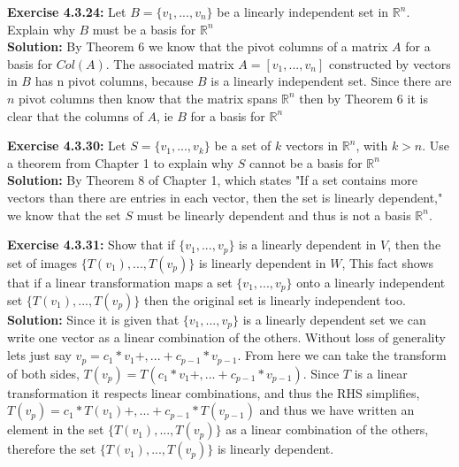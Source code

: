 \documentclass{amsart}
\def\RR{{\mathbb R}}
\begin{document}
\begin{enumerate}
\noindent\textbf{Exercise 4.3.24: } Let $B = \{v_1,...,v_n\}$ be a linearly independent set in $\RR^n$. Explain why $B$ must be a basis for $\RR^n$\\
\noindent \textbf{Solution: } By Theorem 6 we know that the pivot columns of a matrix $A$ for a basis for $Col(A)$. The associated matrix $A = [v_1,...,v_n]$ constructed by vectors in $B$ has n pivot columns, because $B$ is a linearly independent set. Since there are $n$ pivot columns then know that the matrix spans $\RR^n$ then by Theorem 6 it is clear that the columns of $A$, ie $B$ for a basis for $\RR^n$
\vspace{1in}


\noindent\textbf{Exercise 4.3.30: } Let $S =  \{v_1,...,v_k\}$ be a set of $k$ vectors in $\RR^n$, with $k>n$. Use a theorem from Chapter 1 to explain why $S$ cannot be a basis for $\RR^n$ \\

\noindent \textbf{Solution: } By Theorem 8 of Chapter 1, which states "If a set contains more vectors than there are entries in each vector, then the set is linearly dependent," we know that the set $S$ must be linearly dependent and thus is not a basis $\RR^n$.
\vspace{1in}


\noindent\textbf{Exercise 4.3.31: } Show that if $\{v_1,...,v_p\}$ is a linearly dependent in $V$, then the set of images $\{T(v_1),...,T(v_p)\}$ is linearly dependent in $W$, This fact shows that if a linear transformation maps a set $\{v_1,...,v_p\}$ onto a linearly independent set $\{T(v_1),...,T(v_p)\}$ then the original set is linearly independent too.  \\
\noindent \textbf{Solution: } Since it is given that  $\{v_1,...,v_p\}$ is a linearly dependent set we can write one vector as a linear combination of the others. Without loss of generality lets just say $v_p = c_1*v_1+,...+c_{p-1}*v_{p-1}$. From here we can take the transform of both sides, $T(v_p) = T(c_1*v_1+,...+c_{p-1}*v_{p-1})$. Since $T$ is a linear transformation it respects linear combinations, and thus the RHS simplifies, $T(v_p) = c_1*T(v_1)+,...+c_{p-1}*T(v_{p-1})$ and thus we have written an element in the set  $\{T(v_1),...,T(v_p)\}$ as a linear combination of the others, therefore the set  $\{T(v_1),...,T(v_p)\}$ is linearly dependent.
\vspace{1in}




\end{enumerate}
\end{document}
